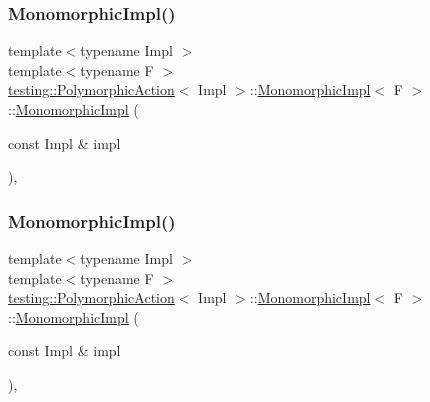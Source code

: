 \subsubsection{\texorpdfstring{MonomorphicImpl()}{MonomorphicImpl()}\hspace{0.1cm}{\footnotesize\ttfamily [2/3]}}
{\footnotesize\ttfamily template$<$typename Impl $>$ \\
template$<$typename F $>$ \\
\mbox{\hyperlink{classtesting_1_1_polymorphic_action}{testing\+::\+Polymorphic\+Action}}$<$ Impl $>$\+::\mbox{\hyperlink{classtesting_1_1_polymorphic_action_1_1_monomorphic_impl}{Monomorphic\+Impl}}$<$ F $>$\+::\mbox{\hyperlink{classtesting_1_1_polymorphic_action_1_1_monomorphic_impl}{Monomorphic\+Impl}} (\begin{DoxyParamCaption}\item[{const Impl \&}]{impl }\end{DoxyParamCaption})\hspace{0.3cm}{\ttfamily [inline]}, {\ttfamily [explicit]}}

\mbox{\label{classtesting_1_1_polymorphic_action_1_1_monomorphic_impl_a0f87e4646298d9fd8e7eda04a09fc6d0}} 
\subsubsection{\texorpdfstring{MonomorphicImpl()}{MonomorphicImpl()}\hspace{0.1cm}{\footnotesize\ttfamily [3/3]}}
{\footnotesize\ttfamily template$<$typename Impl $>$ \\
template$<$typename F $>$ \\
\mbox{\hyperlink{classtesting_1_1_polymorphic_action}{testing\+::\+Polymorphic\+Action}}$<$ Impl $>$\+::\mbox{\hyperlink{classtesting_1_1_polymorphic_action_1_1_monomorphic_impl}{Monomorphic\+Impl}}$<$ F $>$\+::\mbox{\hyperlink{classtesting_1_1_polymorphic_action_1_1_monomorphic_impl}{Monomorphic\+Impl}} (\begin{DoxyParamCaption}\item[{const Impl \&}]{impl }\end{DoxyParamCaption})\hspace{0.3cm}{\ttfamily [inline]}, {\ttfamily [explicit]}}



